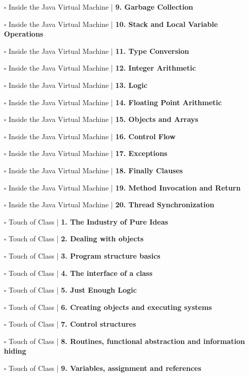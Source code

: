 \documentclass[a4, landscape, 12pt]{article}
\newcommand{\checkbox}{$\square$}%
\begin{document}
\begin{itemize}
{}
\item [\checkbox]  Inside the Java Virtual Machine | \textbf{ 9. Garbage Collection
}
\item [\checkbox]  Inside the Java Virtual Machine | \textbf{ 10. Stack and Local Variable Operations
}
\item [\checkbox]  Inside the Java Virtual Machine | \textbf{ 11. Type Conversion
}
\item [\checkbox]  Inside the Java Virtual Machine | \textbf{ 12. Integer Arithmetic
}
\item [\checkbox]  Inside the Java Virtual Machine | \textbf{ 13. Logic
}
\item [\checkbox]  Inside the Java Virtual Machine | \textbf{ 14. Floating Point Arithmetic
}
\item [\checkbox]  Inside the Java Virtual Machine | \textbf{ 15. Objects and Arrays
}
\item [\checkbox]  Inside the Java Virtual Machine | \textbf{ 16. Control Flow
}
\item [\checkbox]  Inside the Java Virtual Machine | \textbf{ 17. Exceptions
}
\item [\checkbox]  Inside the Java Virtual Machine | \textbf{ 18. Finally Clauses
}
\item [\checkbox]  Inside the Java Virtual Machine | \textbf{ 19. Method Invocation and Return
}
\item [\checkbox]  Inside the Java Virtual Machine | \textbf{ 20. Thread Synchronization
}
\item [\checkbox]  Touch of Class | \textbf{ 1. The Industry of Pure Ideas
}
\item [\checkbox]  Touch of Class | \textbf{ 2. Dealing with objects
}
\item [\checkbox]  Touch of Class | \textbf{ 3. Program structure basics
}
\item [\checkbox]  Touch of Class | \textbf{ 4. The interface of a class
}
\item [\checkbox]  Touch of Class | \textbf{ 5. Just Enough Logic
}
\item [\checkbox]  Touch of Class | \textbf{ 6. Creating objects and executing systems
}
\item [\checkbox]  Touch of Class | \textbf{ 7. Control structures
}
\item [\checkbox]  Touch of Class | \textbf{ 8. Routines, functional abstraction and information hiding
}
\item [\checkbox]  Touch of Class | \textbf{ 9. Variables, assignment and references
}
\end{itemize}
\end{document}
